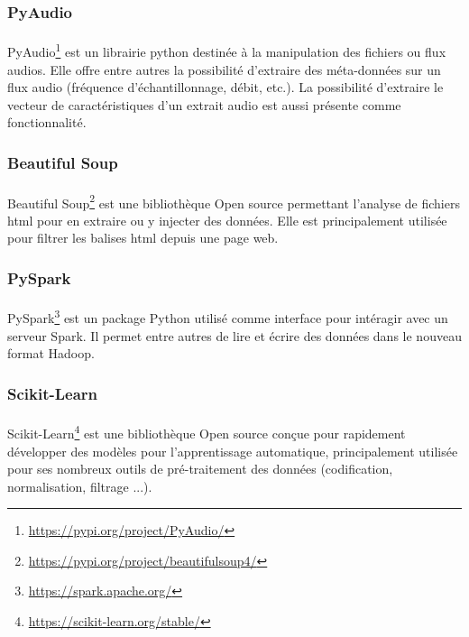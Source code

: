 		\subsubsection*{PyAudio}
		\paragraph{}
		PyAudio\footnote{\url{https://pypi.org/project/PyAudio/}} est un librairie python destinée à la manipulation des fichiers ou flux audios. Elle offre entre autres la possibilité d'extraire des méta-données sur un flux audio (fréquence d'échantillonnage, débit, etc.). La possibilité d'extraire le vecteur de caractéristiques d'un extrait audio est aussi présente comme fonctionnalité.
		
		\subsubsection*{Beautiful Soup}
		\paragraph{}
		Beautiful Soup\footnote{\url{https://pypi.org/project/beautifulsoup4/}} est une bibliothèque Open source permettant l'analyse de fichiers html pour en extraire ou y injecter des données. Elle est principalement utilisée pour filtrer les balises html depuis une page web.
		
		\subsubsection*{PySpark}
		\paragraph{}
		PySpark\footnote{\url{https://spark.apache.org/}} est un package Python utilisé comme interface pour intéragir avec un serveur Spark. Il permet entre autres de lire et écrire des données dans le nouveau format Hadoop.
		
		\subsubsection*{Scikit-Learn}
		\paragraph{}
		Scikit-Learn\footnote{\url{https://scikit-learn.org/stable/}} est une bibliothèque Open source conçue pour rapidement développer des modèles pour l'apprentissage automatique, principalement utilisée pour ses nombreux outils de pré-traitement des données (codification, normalisation, filtrage ...).
		
